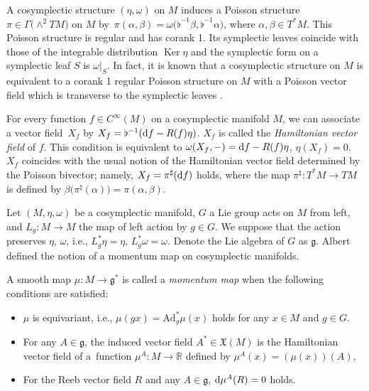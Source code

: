 \documentclass[pdftex]{sigma}
\numberwithin{equation}{section}
\begin{document}
A cosymplectic structure $(\eta,\omega)$ on $M$ induces a Poisson structure $\pi\in\Gamma\bigl(\wedge^2 TM\bigr)$ on $M$ by~$\pi(\alpha,\beta)=\omega\bigl(\flat^{-1}\beta,\flat^{-1}\alpha\bigr)$, where $\alpha,\beta\in T^\ast M$. This Poisson structure is regular and has corank 1. Its symplectic leaves coincide with those of the integrable distribution $\operatorname{Ker}\eta$ and the symplectic form on a symplectic leaf $S$ is $\omega|_S$. In fact, it is known that a cosymplectic structure on $M$ is equivalent to a corank 1 regular Poisson structure on $M$ with a Poisson vector field which is transverse to the symplectic leaves \cite{guillemin2011codimension}.


For every function $f\in C^\infty(M)$ on a cosymplectic manifold $M$, we can associate a vector field~$X_f$ by
$X_f=\flat^{-1}({\rm d}f-R(f)\eta)$.
$X_f$ is called the \textit{Hamiltonian vector field} of $f$. This condition is equivalent to
$\omega(X_f,-)={\rm d}f-R(f)\eta$, $\eta(X_f)=0$. $X_f$ coincides with the usual notion of the Hamiltonian vector field determined by the Poisson bivector; namely, $X_f=\pi^\sharp({\rm d}f)$ holds, where the map $\pi^\sharp\colon T^\ast M\to TM$ is defined by $\beta\bigl(\pi^\sharp(\alpha)\bigr)=\pi(\alpha,\beta)$.

Let $(M,\eta,\omega)$ be a cosymplectic manifold, $G$ a Lie group acts on $M$ from left, and $L_g\colon M\to M$ the map of left action by $g\in G$. We suppose that the action preserves $\eta$, $\omega$, i.e., $L_g^\ast \eta=\eta$, $ L_g^\ast \omega=\omega$. Denote the Lie algebra of $G$ as $\mathfrak{g}$. Albert \cite{albert1989theoreme} defined the notion of a momentum map on cosymplectic manifolds.

\begin{Definition}
 A smooth map $\mu\colon M\to\mathfrak{g}^\ast$ is called a \textit{momentum map} when the following conditions are satisfied:
 \begin{itemize}\itemsep=0pt
 \item $\mu$ is equivariant, i.e., $\mu(gx)=\textrm{Ad}^\ast_g\mu(x)$ holds for any $x\in M$ and $g\in G$.
 \item For any $A\in\mathfrak{g}$, the induced vector field $A^\ast\in\mathfrak{X}(M)$ is the Hamiltonian vector field of a~function $\mu^A\colon M\to\mathbb{R}$ defined by $\mu^A(x)=(\mu(x))(A)$,
 \item For the Reeb vector field $R$ and any $A\in\mathfrak{g}$, ${\rm d}\mu^A(R)=0$ holds.
 \end{itemize}
\end{Definition}
\end{document}
